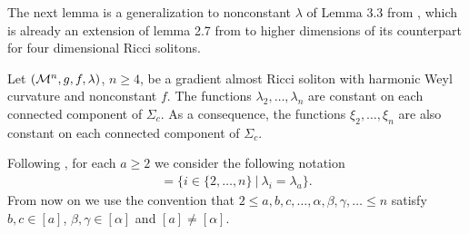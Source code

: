 The next lemma is a generalization to nonconstant $\lambda$ of Lemma 3.3 from , which is already an extension of lemma 2.7 from  to higher dimensions of its counterpart for four dimensional Ricci solitons.
\begin{lema}
	Let $(\mathcal{M}^n,g,f,\lambda)$, $n\geq4$, be a gradient almost Ricci soliton with harmonic Weyl curvature and nonconstant $f$. The functions $\lambda_{2},\ldots,\lambda_{n}$ are constant on each connected component of $\Sigma_{c}$. As a consequence, the functions $\xi_{2},\ldots,\xi_{n}$ are also constant on each connected component of $\Sigma_{c}$.
\end{lema}




Following , for each $a\geq2$ we consider the following notation
\begin{align}
	[a]=\{i\in\{2,\ldots,n\} \ | \ \lambda_{i}=\lambda_{a}\}.
\end{align}
From now on we use the convention that $2\leq a,b,c,\ldots,\alpha,\beta,\gamma,\ldots\leq n$ satisfy $b,c\in[a]$, $\beta,\gamma\in[\alpha]$ and $[a]\neq[\alpha]$.

